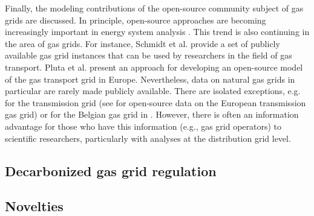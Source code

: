 Finally, the modeling contributions of the open-source community subject of gas grids are discussed. In principle, open-source approaches are becoming increasingly important in energy system analysis \cite{hulk2018transparency}. This trend is also continuing in the area of gas grids. For instance, Schmidt et al. \cite{schmidt2017gaslib} provide a set of publicly available gas grid instances that can be used by researchers in the field of gas transport. Pluta et al. \cite{pluta2022scigrid_gas} present an approach for developing an open-source model of the gas transport grid in Europe. Nevertheless, data on natural gas grids in particular are rarely made publicly available. There are isolated exceptions, e.g. for the transmission grid (see \cite{entsog} for open-source data on the European transmission gas grid) or for the Belgian gas grid in \cite{de2000gas}. However, there is often an information advantage for those who have this information (e.g., gas grid operators) to scientific researchers, particularly with analyses at the distribution grid level. 

\subsection{Decarbonized gas grid regulation}\label{tariffs}






\subsection{Novelties}\label{novelties}
